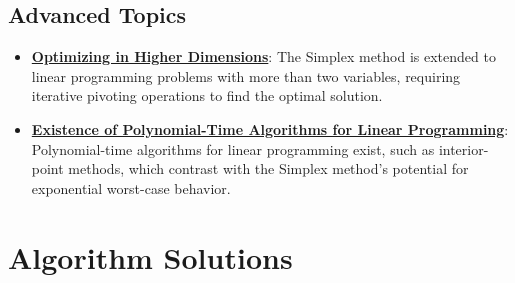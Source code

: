\documentclass{article}%
\begin{document}
\subsection{Advanced Topics}%
\label{subsec:AdvancedTopics}%
\begin{itemize}[leftmargin=*]%
\item \href{https://www.math.purdue.edu/~yipn/421/2024-08-27-ExSimplex.pdf#page=17}{\textbf{Optimizing in Higher Dimensions}}: The Simplex method is extended to linear programming problems with more than two variables, requiring iterative pivoting operations to find the optimal solution.%
\item \href{https://www.math.purdue.edu/~yipn/421/2024-09-05-SimplexEfficiency.pdf#page=12}{\textbf{Existence of Polynomial-Time Algorithms for Linear Programming}}: Polynomial-time algorithms for linear programming exist, such as interior-point methods, which contrast with the Simplex method's potential for exponential worst-case behavior.%
\end{itemize}

%
\section{Algorithm Solutions}%
\label{sec:AlgorithmSolutions}%
\end{document}
